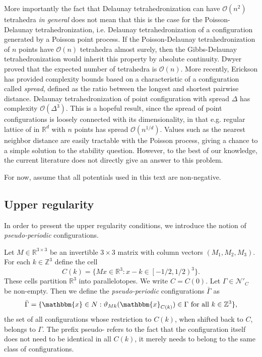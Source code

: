 \documentclass[12pt,a4paper]{article}
\newcommand{\R}{{\mathbb R^3}}
\theoremstyle{definition}
\theoremstyle{remark}
\theoremstyle{theorem}
\newcommand{\x}{\mathbbm{x}}
\begin{document}
More importantly the fact that Delaunay tetrahedronization  can have $\mathcal O(n^2)$ tetrahedra \textit{in general} does not mean that this is the case for the Poisson-Delaunay tetrahedronization, i.e. Delaunay tetrahedronization of a configuration generated by a Poisson point process. If the Poisson-Delaunay tetrahedronization of $n$ points have $\mathcal O(n)$ tetrahedra almost surely, then the Gibbs-Delaunay tetrahedronization would inherit this property by absolute continuity. Dwyer \cite{Dwyer93} proved that the expected number of tetrahedra is $\mathcal O(n)$. More recently, Erickson has provided \cite{Erickson01}\cite{Erickson05} complexity bounds based on a characteristic of a configuration called \textit{spread}, defined as the ratio between the longest and shortest pairwise distance. Delaunay tetrahedronization of point configuration with spread $\Delta$ has complexity $\mathcal O(\Delta^3)$. This is a hopeful result, since the spread of point configurations is loosely connected with its dimensionality, in that e.g. regular lattice of in $\mathbb R^d$ with $n$ points has spread $\mathcal O(n^{1/d})$. Values such as the nearest neighbor distance are easily tractable with the Poisson process, giving a chance to a simple solution to the stability question. However, to the best of our knowledge, the current literature does not directly give an answer to this problem.


For now, assume that all potentials used in this text are non-negative.

\subsection{Upper regularity}

In order to present the upper regularity conditions, we introduce the notion of \textit{pseudo-periodic} configurations. 

Let $M\in\mathbb R^{3\times 3}$ be an invertible $3\times 3$ matrix with column vectors $(M_1,M_2,M_3)$. For each $k \in \mathbb Z^3$ define the cell
$$C(k) =  \{Mx \in \R: x-k \in \left[ -1/2, 1/2 \right)^3 \}.$$
These cells partition $\R$ into parallelotopes. We write $C=C(0)$. Let $\Gamma \in \mathcal N'_C$ be non-empty. Then we define the \textit{pseudo-periodic} configurations $\bar \Gamma$ as
$$\bar \Gamma = \{ \x \in N: \vartheta_{Mk}(\x_{C(k)}) \in \Gamma \text{ for all } k \in \mathbb Z^3 \},$$
the set of all configurations whose restriction to $C(k)$, when shifted back to $C$, belongs to $\Gamma$. The prefix pseudo- refers to the fact that the configuration itself does not need to be identical in all $C(k)$, it merely needs to belong to the same class of configurations.
\end{document}
